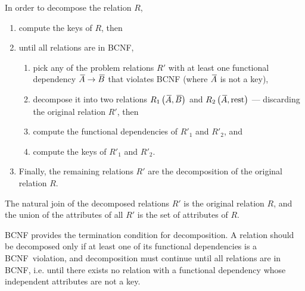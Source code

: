 In order to decompose the relation \( R \),
\begin{enumerate}
  \item compute the keys of \( R \), then
  \item until all relations are in BCNF,
  \begin{enumerate}
    \item pick any of the problem relations \( R' \) with at least one functional dependency \( {}\mkern3mu\overline{\mkern-3muA} \rightarrow {}\mkern3mu\overline{\mkern-3muB} \) that violates BCNF (where \( {}\mkern3mu\overline{\mkern-3muA} \) is not a key),
    \item decompose it into two relations \( R_1\left( {}\mkern3mu\overline{\mkern-3muA}, {}\mkern3mu\overline{\mkern-3muB} \right) \) and \( R_2\left( {}\mkern3mu\overline{\mkern-3muA}, \text{rest} \right) \) --- discarding the original relation \( R' \), then
    \item compute the functional dependencies of \( R'_1 \) and \( R'_2 \), and
    \item compute the keys of \( R'_1 \) and \( R'_2 \).
  \end{enumerate}
  \item Finally, the remaining relations \( R' \) are the decomposition of the original relation \( R \).
\end{enumerate}


The natural join of the decomposed relations \( R' \) is the original relation \( R \), and the union of the attributes of all \( R' \) is the set of attributes of \( R \).

BCNF provides the termination condition for decomposition.
A relation should be decomposed only if at least one of its functional dependencies is a BCNF~violation, and decomposition must continue until all relations are in BCNF, i.e. until there exists no relation with a functional dependency whose independent attributes are not a key.
